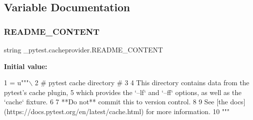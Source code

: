 \subsection{Variable Documentation}
\mbox{\label{namespace__pytest_1_1cacheprovider_a494d6ed7a08de399160e10bbe090e216}} 
\subsubsection{\texorpdfstring{R\+E\+A\+D\+M\+E\+\_\+\+C\+O\+N\+T\+E\+NT}{README\_CONTENT}}
{\footnotesize\ttfamily string \+\_\+pytest.\+cacheprovider.\+R\+E\+A\+D\+M\+E\+\_\+\+C\+O\+N\+T\+E\+NT}

{\bfseries Initial value\+:}
\begin{DoxyCode}
1 =  \textcolor{stringliteral}{u"""\(\backslash\)}
2 \textcolor{stringliteral}{# pytest cache directory #}
3 \textcolor{stringliteral}{}
4 \textcolor{stringliteral}{This directory contains data from the pytest's cache plugin,}
5 \textcolor{stringliteral}{which provides the `--lf` and `--ff` options, as well as the `cache` fixture.}
6 \textcolor{stringliteral}{}
7 \textcolor{stringliteral}{**Do not** commit this to version control.}
8 \textcolor{stringliteral}{}
9 \textcolor{stringliteral}{See [the docs](https://docs.pytest.org/en/latest/cache.html) for more information.}
10 \textcolor{stringliteral}{"""}
\end{DoxyCode}
